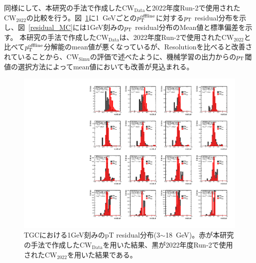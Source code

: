 同様にして、本研究の手法で作成した$\mathrm{CW_{Data}}$と2022年度Run-2で使用された$\mathrm{CW_{2022}}$の比較を行う。図~\ref{residual_Data_3_18}に1~GeVごとの$p_{\rm{T}}^{\rm{offline}}$に対する$p_{\rm{T}}$ residual分布を示し、図~\ref{residual_MC}には1GeV刻みの$p_{\rm{T}}$ residual分布のMean値と標準偏差を示す。
本研究の手法で作成した$\mathrm{CW_{Data}}$は、2022年度Run-2で使用された$\mathrm{CW_{2022}}$と比べて$p_{\rm{T}}^{\rm{offline}}$分解能のmean値が悪くなっているが、Resolutionを比べると改善されていることから、$\mathrm{CW_{Simu}}$の評価で述べたように、機械学習の出力からの$p_{\rm{T}}$閾値の選択方法によってmean値においても改善が見込まれる。
\begin{figure}[htbp]
  \centering
  \hspace*{-1cm}
  \includegraphics[clip, width=16cm]{fig/5/residual_Data_3_18.pdf}
  \caption{TGCにおける1GeV刻みのpT residual分布(3$\sim$18~GeV)。赤が本研究の手法で作成した$\mathrm{CW_{Data}}$を用いた結果、黒が2022年度Run-2で使用された$\mathrm{CW_{2022}}$を用いた結果である。}
  \label{residual_Data_3_18}
\end{figure}




